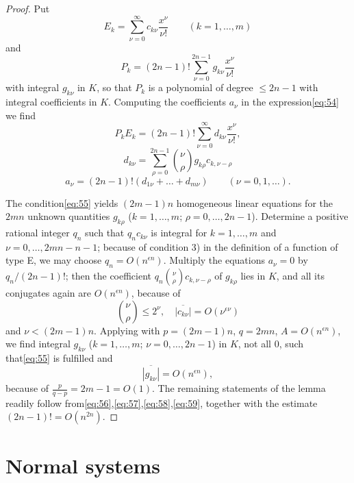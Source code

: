 \begin{proof}
Put
\[E_{k} = \sum_{\nu=0}^{\infty} c_{k\nu} \frac{x^{\nu}}{\nu!} \qquad (k=1,\dots,m)\]
and
\begin{equation}
P_{k} = (2n-1)! \sum_{\nu=0}^{2n-1} g_{k\nu} \frac{x^{\nu}}{\nu!} \tag{56}\label{eq:56}
\end{equation}
with integral $g_{k\nu}$ in $K$, so that $P_k$ is a polynomial of degree $\le 2n-1$ with integral coefficients in $K$. Computing the coefficients $a_{\nu}$ in the expression\eqref{eq:54} we find
\begin{equation}
P_{k}E_{k} = (2n-1)! \sum_{\nu=0}^{\infty} d_{k\nu} \frac{x^{\nu}}{\nu!}, \tag{57}\label{eq:57}
\end{equation}
\[d_{k\nu} = \sum_{\rho=0}^{2n-1} \binom{\nu}{\rho} g_{k\rho} c_{k,\nu-\rho}\]
\begin{equation}
a_{\nu} = (2n-1)!(d_{1\nu} + \dots + d_{m\nu}) \qquad (\nu = 0, 1, \dots). \tag{58}\label{eq:58}
\end{equation}

The condition\eqref{eq:55} yields $(2m-1)n$ homogeneous linear equations for the $2mn$ unknown quantities $g_{k\rho}$ ($k=1,\dots,m$; $\rho=0,\dots,2n-1$). Determine a positive rational integer $q_n$ such that $q_n c_{k\nu}$ is integral for $k=1,\dots,m$ and $\nu=0,\dots,2mn-n-1$; because of condition 3) in the definition of a function of type E, we may choose $q_n = O(n^{\epsilon n})$. Multiply the equations $a_{\nu}=0$ by $q_n/(2n-1)!$; then the coefficient $q_n \binom{\nu}{\rho} c_{k,\nu-\rho}$ of $g_{k\rho}$ lies in $K$, and all its conjugates again are $O(n^{\epsilon n})$, because of
\begin{equation}
\binom{\nu}{\rho} \le 2^{\nu}, \quad \overline{|c_{k\nu}|} = O(\nu^{\epsilon \nu}) \tag{59}\label{eq:59}
\end{equation}
and $\nu < (2m-1)n$. Applying with $p=(2m-1)n$, $q=2mn$, $A=O(n^{\epsilon n})$, we find integral $g_{k\nu}$ ($k=1,\dots,m$; $\nu=0,\dots,2n-1$) in $K$, not all 0, such that\eqref{eq:55} is fulfilled and
\[\overline{|g_{k\nu}|} = O(n^{\epsilon n}),\]
because of $\frac{p}{q-p} = 2m-1 = O(1)$. The remaining statements of the lemma readily follow from\eqref{eq:56},\eqref{eq:57},\eqref{eq:58},\eqref{eq:59}, together with the estimate $(2n-1)! = O(n^{2n})$.
\end{proof}

\section{Normal systems}\label{sec:4}

